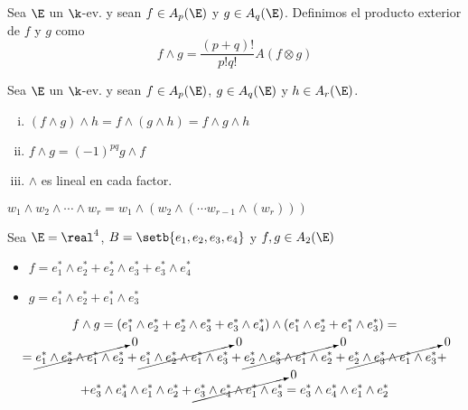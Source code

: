 \begin{defi}
    Sea $ \E $ un $ \k $-ev.  y sean $ f \in A_p(\E) $ y $ g \in A_q(\E)
    $.  Definimos el producto exterior de $ f $ y $ g $ como
    \[
        f \wedge g = \frac{(p+q)!}{p!q!}A(f \otimes g)
    \]
\end{defi}
\begin{prop}
    Sea $ \E $ un $ \k $-ev.  y sean $ f \in A_p(\E) $, $ g \in A_q(\E) $
    y $ h \in A_r(\E) $.
    \begin{enumerate}[i)]
    \item
        $ (f \wedge g) \wedge h = f \wedge (g \wedge h) = f \wedge g
        \wedge h $
    \item
        $ f \wedge g = (-1)^{pq} g \wedge f $
    \item
        $ \wedge $ es lineal en cada factor.
\end{enumerate}
\end{prop}
\begin{obs}
    $ w_1 \wedge w_2 \wedge \cdots \wedge w_r = w_1 \wedge (w_2 \wedge (
    \cdots w_{r-1} \wedge (w_r))) $
\end{obs}
\begin{example}
    Sea $ \E = \real ^4 $, $ B = \setb{e_1,e_2,e_3,e_4} $ y $ f,g \in A_2
    (\E) $
    \begin{itemize}
        \item
            $ f = e_1^* \wedge e_2^* + e_2^* \wedge e_3^* + e_3^* \wedge
            e_4^* $
        \item
            $ g = e_1^* \wedge e_2^* + e_1^* \wedge e_3^* $
    \end{itemize}
    \begin{gather*}
        f \wedge g = (e_1^* \wedge e_2^* + e_2^* \wedge e_3^* + e_3^*
        \wedge e_4^*) \wedge (e_1^* \wedge e_2^* + e_1^* \wedge e_3^*) =
        \\
        = \cancelto{0}{e_1^* \wedge e_2^* \wedge e_1^* \wedge e_2^*} +
        \cancelto{0}{e_1^* \wedge e_2^* \wedge e_1^* \wedge e_3^*} +
        \cancelto{0}{e_2^* \wedge e_3^* \wedge e_1^* \wedge e_2^*} +
        \cancelto{0}{e_2^* \wedge e_3^* \wedge e_1^* \wedge e_3^*} + \\
        + e_3^* \wedge e_4^* \wedge e_1^* \wedge e_2^* + \cancelto{0}{e_3^*
        \wedge e_4^* \wedge e_1^* \wedge e_3^*} = e_3^* \wedge e_4^*
        \wedge e_1^* \wedge e_2^*
    \end{gather*}
\end{example}
